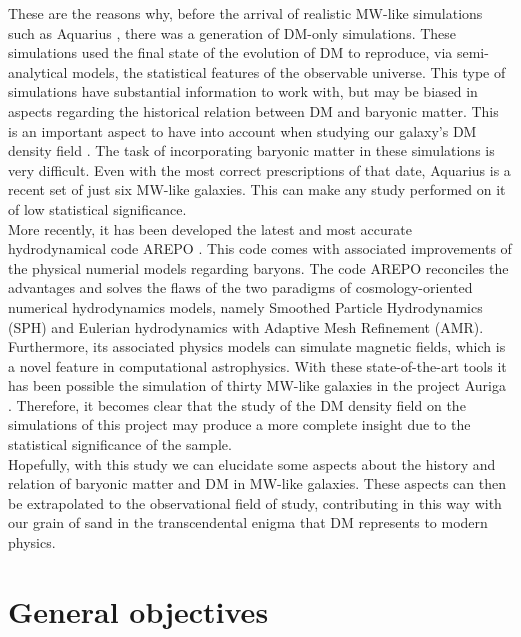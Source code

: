 \documentclass[12pt]{article}
\begin{document}
These are the reasons why, before the arrival of realistic MW-like simulations such as Aquarius \cite{aquarius}, there was a generation of DM-only simulations.
These simulations used the final state of the evolution of DM to reproduce, via semi-analytical models, the statistical features of the observable universe. 
This type of simulations have substantial information to work with, but may be biased in aspects regarding the historical relation between DM and baryonic matter.
This is an important aspect to have into account when studying our galaxy's DM density field \cite{Bryan2012}.
The task of incorporating baryonic matter in these simulations is very difficult.
Even with the most correct prescriptions of that date, Aquarius is a recent set of just six MW-like galaxies.
This can make any study performed on it of low statistical significance.\\

More recently, it has been developed the latest and most accurate hydrodynamical code AREPO \cite{arepo}. 
This code comes with associated improvements of the physical numerial models regarding baryons. 
The code AREPO reconciles the advantages and solves the flaws of the two paradigms of cosmology-oriented numerical hydrodynamics models, namely Smoothed Particle Hydrodynamics (SPH) and Eulerian hydrodynamics with Adaptive Mesh Refinement (AMR). 
Furthermore, its associated physics models can simulate magnetic fields, which is a novel feature in computational astrophysics. 
With these state-of-the-art tools it has been possible the simulation of thirty MW-like galaxies in the project Auriga \cite{auriga}.
Therefore, it becomes clear that the study of the DM density field on the simulations of this project may produce a more complete insight due to the statistical significance of the sample.
\\


Hopefully, with this study we can elucidate some aspects about the history and relation of baryonic matter and DM in MW-like galaxies.
These aspects can then be extrapolated to the observational field of study, contributing in this way with our grain of sand in the transcendental enigma that DM represents to modern physics.\\




\section{General objectives}
\end{document}
